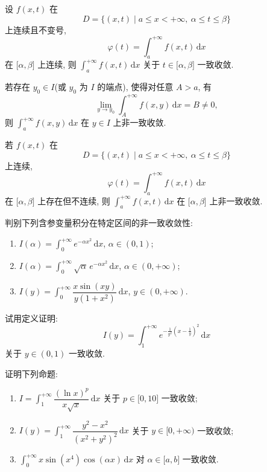 \documentclass[../数学分析培优讲义.tex]{subfiles}
\begin{document}
\begin{theorem}
设 $f(x,t)$ 在
\[
    D=\{(x,t)\mid a\leq x<+\infty,\ \alpha\leq t\leq\beta\}
\]
上连续且不变号,
\[
    \varphi(t)=\int_a^{+\infty}f(x,t)\,\mathrm{d}x
\]
在 $\lbrack\alpha,\beta\rbrack$ 上连续, 则 $\displaystyle\int_a^{+\infty}f(x,t)\,\mathrm{d}x$ 关于 $t\in\lbrack\alpha,\beta\rbrack$ 一致收敛.
\end{theorem}

\begin{proposition}
若存在 $y_0\in I$(或 $y_0$ 为 $I$ 的端点), 使得对任意 $A>a$, 有
\[
    \lim\limits_{y\to y_0}\int_A^{+\infty}f(x,y)\,\mathrm{d}x=B\ne0,
\]
则 $\displaystyle\int_a^{+\infty}f(x,y)\,\mathrm{d}x$ 在 $y\in I$ 上非一致收敛.
\end{proposition}

\begin{theorem}[\markstar]
若 $f(x,t)$ 在
\[
    D=\{(x,t)\mid a\leq x<+\infty,\ \alpha\leq t\leq\beta\}
\]
上连续,
\[
    \varphi(t)=\int_a^{+\infty}f(x,t)\,\mathrm{d}x
\]
在 $\lbrack\alpha,\beta\rbrack$ 上存在但不连续, 则 $\displaystyle\int_a^{+\infty}f(x,t)\,\mathrm{d}x$ 在 $\lbrack\alpha,\beta\rbrack$ 上非一致收敛.
\end{theorem}

\begin{example}
判别下列含参变量积分在特定区间的非一致收敛性:
\begin{enumerate}[label=(\arabic*)]
    \item $\displaystyle I(\alpha)=\int_0^{+\infty}e^{-\alpha x^2}\,\mathrm{d}x$, $\alpha\in(0,1)$;
    \item $\displaystyle I(\alpha)=\int_0^{+\infty}\sqrt{\alpha}\,e^{-\alpha x^2}\,\mathrm{d}x$, $\alpha\in(0,+\infty)$;
    \item $\displaystyle I(y)=\int_0^{+\infty}\dfrac{x\sin(xy)}{y(1+x^2)}\,\mathrm{d}x$, $y\in(0,+\infty)$.
\end{enumerate}
\end{example}
\exampleblank

\begin{example}
试用定义证明:
\[
    I(y)=\int_1^{+\infty}e^{-\frac{1}{y^2}(x-\frac{1}{y})^2}\,\mathrm{d}x
\]
关于 $y\in(0,1)$ 一致收敛.
\end{example}
\exampleblank

\begin{example}
证明下列命题:
\begin{enumerate}[label=(\arabic*)]
    \item $\displaystyle I=\int_1^{+\infty}\dfrac{(\ln x)^p}{x\sqrt{x}}\,\mathrm{d}x$ 关于 $p\in\lbrack0,10\rbrack$ 一致收敛;
    \item $\displaystyle I(y)=\int_1^{+\infty}\dfrac{y^2-x^2}{(x^2+y^2)^2}\,\mathrm{d}x$ 关于 $y\in\lbrack0,+\infty)$ 一致收敛;
    \item $\displaystyle \int_0^{+\infty}x\sin(x^4)\cos(\alpha x)\,\mathrm{d}x$ 对 $\alpha\in\lbrack a,b\rbrack$ 一致收敛.
\end{enumerate}
\end{example}
\exampleblank
\end{document}
